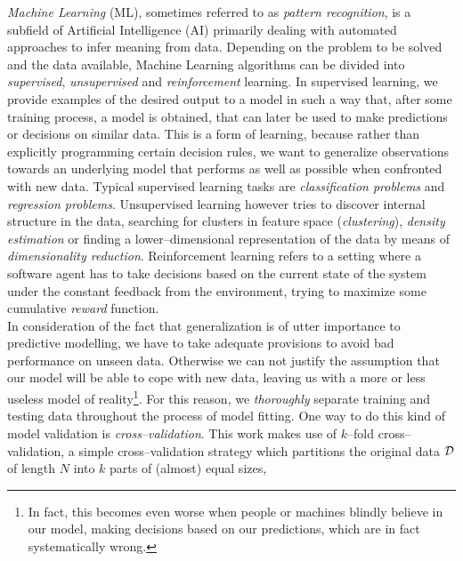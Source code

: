 \emph{Machine Learning} (ML), sometimes referred to as \emph{pattern recognition}, is a subfield of Artificial Intelligence (AI) primarily dealing with automated approaches to infer meaning from data. Depending on the problem to be solved and the data available, Machine Learning algorithms can be divided into \emph{supervised}, \emph{unsupervised} and \emph{reinforcement} learning. In supervised learning, we provide examples of the desired output to a model in such a way that, after some training process, a model is obtained, that can later be used to make predictions or decisions on similar data. This is a form of learning, because rather than explicitly programming certain decision rules, we want to generalize observations towards an underlying model that performs as well as possible when confronted with new data. Typical supervised learning tasks are \emph{classification problems} and \emph{regression problems}. Unsupervised learning however tries to discover internal structure in the data, \eg searching for clusters in feature space (\emph{clustering}), \emph{density estimation} or finding a lower--dimensional representation of the data by means of \emph{dimensionality reduction}. Reinforcement learning refers to a setting where a software agent has to take decisions based on the current state of the system under the constant feedback from the environment, trying to maximize some cumulative \emph{reward} function.\\


In consideration of the fact that generalization is of utter importance to predictive modelling, we have to take adequate provisions to avoid bad performance on unseen data. Otherwise we can not justify the assumption that our model will be able to cope with new data, leaving us with a more or less useless model of reality\footnote{In fact, this becomes even worse when people or machines blindly believe in our model, making decisions based on our predictions, which are in fact systematically wrong.}. For this reason, we \emph{thoroughly} separate training and testing data throughout the process of model fitting. One way to do this kind of model validation is \emph{cross--validation}. This work makes use of $k$--fold cross--validation, a simple cross--validation strategy which partitions the original data $\mathcal{D}$ of length $N$ into $k$ parts of (almost) equal sizes,

